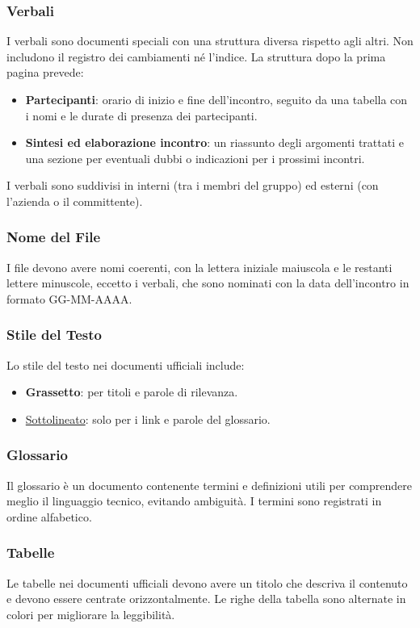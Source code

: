 \subsubsection{Verbali}
I verbali sono documenti speciali con una struttura diversa rispetto agli altri. Non includono il registro dei cambiamenti né l'indice.
La struttura dopo la prima pagina prevede:
\begin{itemize}
    \item \textbf{Partecipanti}: orario di inizio e fine dell'incontro, seguito da una tabella con i nomi e le durate di presenza dei partecipanti.
    \item \textbf{Sintesi ed elaborazione incontro}: un riassunto degli argomenti trattati e una sezione per eventuali dubbi o indicazioni per i prossimi incontri.
\end{itemize}
I verbali sono suddivisi in interni (tra i membri del gruppo) ed esterni (con l'azienda o il committente).


\subsubsection{Nome del File}
I file devono avere nomi coerenti, con la lettera iniziale maiuscola e le restanti lettere minuscole, 
eccetto i verbali, che sono nominati con la data dell'incontro in formato GG-MM-AAAA.

\subsubsection{Stile del Testo}
Lo stile del testo nei documenti ufficiali include:
\begin{itemize}
    \item \textbf{Grassetto}: per titoli e parole di rilevanza.
    \item \underline{Sottolineato}: solo per i link e parole del glossario.
\end{itemize}

\subsubsection{Glossario}
Il glossario è un documento contenente termini e definizioni utili per comprendere meglio il linguaggio tecnico, evitando ambiguità. 
I termini sono registrati in ordine alfabetico.


\subsubsection{Tabelle}
Le tabelle nei documenti ufficiali devono avere un titolo che descriva il contenuto e devono essere centrate orizzontalmente. 
Le righe della tabella sono alternate in colori per migliorare la leggibilità. 

